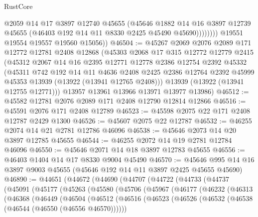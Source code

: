\begin{lexlean}{RustCore}
\begin{coremodule}
                    @2059
                    @14
                    @17
                    @3897
                    @12740
                    @45655
                    (@45646
                      @1882
                      @14
                      @16
                      @3897
                      @12739
                      @45655
                      (@46403 @192 @14 @11 @8330 @2425 @45490 @45690))))))))
        @19551
        @19554
        @19557
        @19560
        @15056))
@46504 := @45267
    @2069
    @2076
    @2089
    @171
    @12772
    @12781
    @2408
    @12868
    (@45303
      @2068
      @17
      @315
      @12772
      @12779
      @2415
      (@45312
        @2067
        @14
        @16
        @2395
        @12771
        @12778
        @2386
        @12754
        @2392
        @45332
        (@45311
          @742
          @192
          @14
          @11
          @4636
          @2408
          @2425
          @2386
          @12764
          @2392
          @45999
          @45353
          @13939
          (@13922 (@13941 @12765 @2408)))
        @13939
        (@13922 (@13941 @12755 @12771)))
      @13957
      @13961
      @13966
      @13971
      @13977
      @13986)
@46512 := @45582 @12781 @2076 @2089 @171 @2408 @12790 @12814 @12866
@46516 := @45591 @2076 @171 @2408 @12789
@46523 := @45598 @2075 @22 @171 @2408 @12787 @2429 @1300
@46526 := @45607 @2075 @22 @12787
@46532 := @46255 @2074 @14 @21 @2781 @12786 @46096
@46538 := @45646 @2073 @14 @20 @3897 @12785 @45655
@46544 := @46255 @2072 @14 @19 @2781 @12784 @46096
@46550 := @45646 @2071 @14 @18 @3897 @12783 @45655
@46556 := @46403 @1404 @14 @17 @8330 @9004 @45490
@46570 := @45646 @995 @14 @16 @3897 @9003 @45655 (@45646 @192 @14 @11 @3897 @2425 @45655 @45690)
@46890 := @44651
    (@44672
      (@44690
        (@44707
          (@44722
            (@44733
              (@44737
                (@45091
                  (@45177
                    (@45263
                      (@45580
                        (@45706
                          (@45967
                            (@46177
                              (@46232
                                (@46313
                                  (@46368
                                    (@46449
                                      (@46504
                                        (@46512
                                          (@46516
                                            (@46523
                                              (@46526
                                                (@46532 (@46538 (@46544 (@46550 (@46556 @46570))))))

\end{coremodule}
\end{lexlean}
